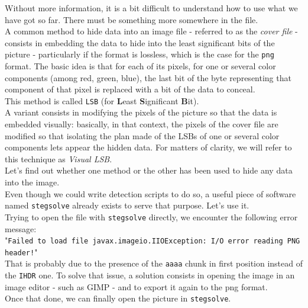 \documentclass[12pt,a4paper]{article}
\begin{document}
    Without more information, it is a bit difficult to understand how to use
    what we have got so far. There must be something more somewhere in the
    file.\\
    A common method to hide data into an image file - referred to as the
    \textit{cover file} - consists in embedding the data to hide into the least
    significant bits of the picture - particularly if the format is lossless,
    which is the case for the \texttt{png} format.  The basic idea is that for
    each of its pixels, for one or several color components (among red, green,
    blue), the last bit of the byte representing that component of that pixel
    is replaced with a bit of the data to conceal.\\
    This method is called \texttt{LSB} (for \textbf{L}east
    \textbf{S}ignificant \textbf{B}it).\\
    A variant consists in modifying the pixels of the picture so that the data
    is embedded visually: basically, in that context, the pixels of the cover
    file are modified so that isolating the plan made of the LSBs of one or
    several color components lets appear the hidden data. For matters of clarity,
    we will refer to this technique as \textit{Visual LSB}.\\


    Let's find out whether one method or the other has been used to hide any
    data into the image.\\
    Even though we could write detection scripts to do so, a useful piece of
    software named \texttt{stegsolve} already exists to serve that purpose.
    Let's use it.\\

    Trying to open the file with \texttt{stegsolve} directly, we encounter the
    following error message: \\
    "\texttt{Failed to load file javax.imageio.IIOException: I/O error reading PNG header!}"\\
    That is probably due to the presence of the \texttt{aaaa} chunk in first position instead of the \texttt{IHDR} one. To solve that issue, a solution consists in opening the image in an image editor - such as GIMP - and to export it again to the png format.\\

    Once that done, we can finally open the picture in \texttt{stegsolve}.

    
\end{document}
